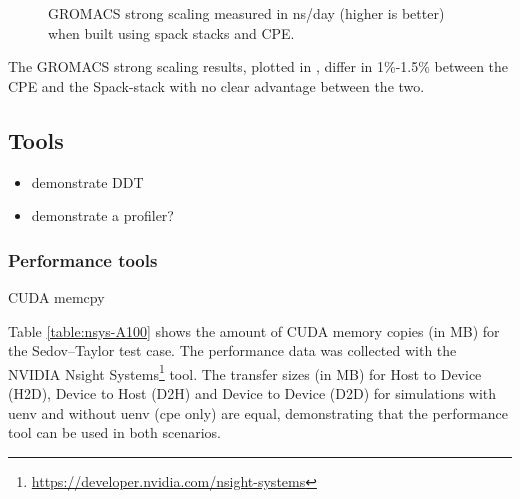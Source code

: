 \begin{figure}[htp!]
    \begin{center}
        
    \end{center}
    \caption{GROMACS strong scaling measured in ns/day (higher is better) when built using spack stacks and CPE.}
    \label{fig:gromacs-strong}
\end{figure}

The GROMACS strong scaling results, plotted in , differ in 1\%-1.5\% between the CPE and the Spack-stack with no clear advantage between the two.

\subsection{Tools}


\begin{itemize}
    \item demonstrate DDT
    \item demonstrate a profiler?
\end{itemize}

\subsubsection{Performance tools}

\begin{table}[htp!]
    \centering
    \caption{CUDA memcpy}
    \label{table:nsys-A100}
\end{table}

Table \ref{table:nsys-A100} shows the amount of CUDA memory copies (in MB) for the Sedov--Taylor test case.
The performance data was collected with the NVIDIA {Nsight Systems\footnote{\url{https://developer.nvidia.com/nsight-systems}}}  tool.
The transfer sizes (in MB) for Host to Device (H2D), Device to Host (D2H) and Device to Device (D2D) for simulations with uenv and without uenv (cpe only) are equal, demonstrating that the performance tool can be used in both scenarios.

